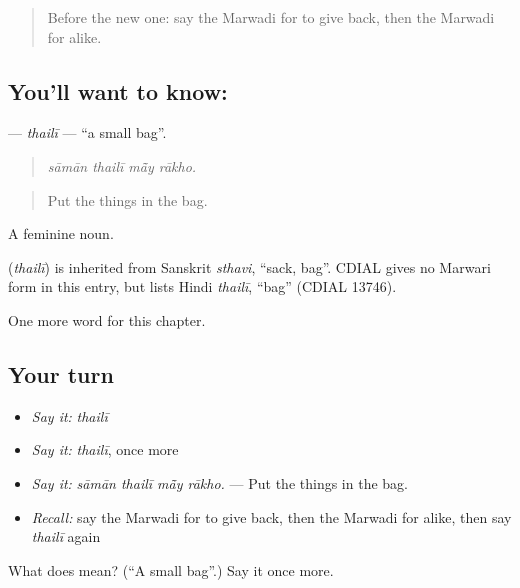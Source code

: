 \begin{quote}
Before the new one: say the Marwadi for to give back, then the Marwadi for alike.
\end{quote}

\subsection*{You'll want to know: }
\textbf{} — \emph{thailī} — \textquotedblleft{}a small bag\textquotedblright{}.

\begin{quote}
   
\end{quote}

\begin{quote}
\emph{sāmān thailī mā̃y rākho.}
\end{quote}

\begin{quote}
Put the things in the bag.
\end{quote}

A feminine noun.

\begin{cousinweb}
\textbf{} (\emph{thailī}) is inherited from Sanskrit \emph{sthavi}, \textquotedblleft{}sack, bag\textquotedblright{}. CDIAL gives no Marwari form in this entry, but lists Hindi \emph{thailī}, \textquotedblleft{}bag\textquotedblright{} (CDIAL 13746).
\end{cousinweb}

\begin{grammarlens}[title={What you've built}]
One more word for this chapter.
\end{grammarlens}

\subsection*{Your turn}
\begin{itemize}
\raggedright
  \item \emph{Say it:} \emph{thailī}
  \item \emph{Say it:} \emph{thailī}, once more
  \item \emph{Say it:} \emph{sāmān thailī mā̃y rākho.} — Put the things in the bag.
  \item \emph{Recall:} say the Marwadi for to give back, then the Marwadi for alike, then say \emph{thailī} again
\end{itemize}

\begin{tcolorbox}[breakable,colback=teal!4,colframe=teal!35!black,title={Before you move on}]
What does  mean? (\textquotedblleft{}A small bag\textquotedblright{}.) Say it once more.
\end{tcolorbox}
